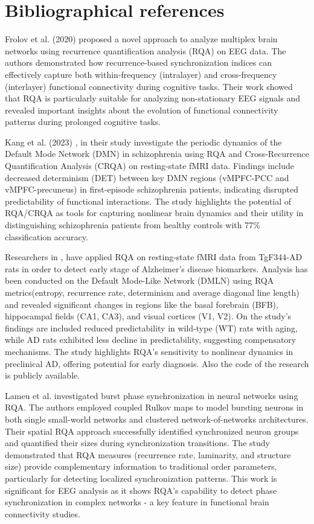 \documentclass{article}
\begin{document}
\section*{Bibliographical references}

Frolov et al. (2020) proposed a novel approach to analyze multiplex brain networks using recurrence quantification analysis (RQA) 
on EEG data. The authors demonstrated how recurrence-based synchronization indices can effectively capture 
both within-frequency (intralayer) and cross-frequency (interlayer) functional connectivity during cognitive tasks. 
Their work showed that RQA is particularly suitable for analyzing non-stationary EEG signals and revealed
important insights about the evolution of functional connectivity patterns during prolonged cognitive tasks.

Kang et al. (2023) \cite{kang}, in their study investigate the periodic dynamics of the 
Default Mode Network (DMN) in schizophrenia using 
RQA and Cross-Recurrence Quantification Analysis (CRQA) on resting-state fMRI data. 
Findings include decreased determinism (DET) between key DMN regions 
(vMPFC-PCC and vMPFC-precuneus) in first-episode schizophrenia patients, 
indicating disrupted predictability of functional interactions. 
The study highlights the potential of RQA/CRQA as tools for capturing nonlinear brain dynamics 
and their utility in distinguishing schizophrenia patients from healthy controls with 77\% 
classification accuracy.

Researchers in \cite{rezaei},
have applied RQA on resting-state fMRI data from TgF344-AD rats in order 
to detect early stage of Alzheimer's disease biomarkers. 
Analysis has been conducted on the Default Mode-Like Network (DMLN) 
using RQA metrics(entropy, recurrence rate, determinism and average diagonal line length) 
and revealed significant changes in regions like 
the basal forebrain (BFB), hippocampal fields (CA1, CA3), and visual 
cortices (V1, V2). 
On the study's findings are included reduced predictability in 
wild-type (WT) rats with aging, while AD rats exhibited less decline
in predictability, suggesting compensatory mechanisms. 
The study highlights RQA's sensitivity to nonlinear dynamics 
in preclinical AD, offering potential for early diagnosis. Also the code of the
research is publicly available.

Lameu et al. \cite{lameu2018} investigated burst phase synchronization in neural networks using 
RQA. The authors employed coupled Rulkov maps to model bursting neurons in both single small-world networks
and clustered network-of-networks architectures. Their spatial RQA approach successfully identified 
synchronized neuron groups and quantified their sizes during synchronization transitions. The study
demonstrated that RQA measures (recurrence rate, laminarity, and structure size) provide complementary 
information to traditional order parameters, particularly for detecting localized synchronization patterns. 
This work is significant for EEG analysis as it shows RQA's capability to detect phase synchronization 
in complex networks - a key feature in functional brain connectivity studies.
\end{document}
